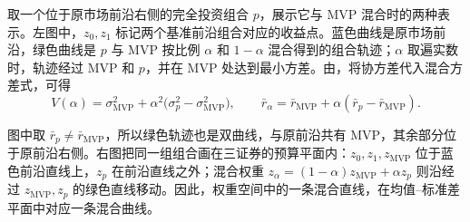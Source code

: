  取一个位于原市场前沿右侧的完全投资组合 $p$，展示它与 MVP 混合时的两种表示。左图中，$z_0,z_1$ 标记两个基准前沿组合对应的收益点。蓝色曲线是原市场前沿，绿色曲线是 $p$ 与 MVP 按比例 $\alpha$ 和 $1-\alpha$ 混合得到的组合轨迹；$\alpha$ 取遍实数时，轨迹经过 MVP 和 $p$，并在 MVP 处达到最小方差。由，将协方差代入混合方差式，可得
\[
 V(\alpha)=\sigma_{\mathrm{MVP}}^2
 +\alpha^2\bigl(\sigma_p^2-\sigma_{\mathrm{MVP}}^2\bigr),\qquad
 \bar r_\alpha=\bar r_{\mathrm{MVP}}+\alpha(\bar r_p-\bar r_{\mathrm{MVP}}).
\]

图中取 $\bar r_p\ne\bar r_{\mathrm{MVP}}$，所以绿色轨迹也是双曲线，与原前沿共有 MVP，其余部分位于原前沿右侧。右图把同一组组合画在三证券的预算平面内：$z_0,z_1,z_{\mathrm{MVP}}$ 位于蓝色前沿直线上，$z_p$ 在前沿直线之外；混合权重 $z_\alpha=(1-\alpha)z_{\mathrm{MVP}}+\alpha z_p$ 则沿经过 $z_{\mathrm{MVP}},z_p$ 的绿色直线移动。因此，权重空间中的一条混合直线，在均值--标准差平面中对应一条混合曲线。

\begin{center}
\begin{minipage}{\linewidth}
\centering
\renewcommand{\thewjFigure}{\thechapter.S\arabic{wjFigure}}%
%
\par
{}
\end{minipage}
\end{center}

